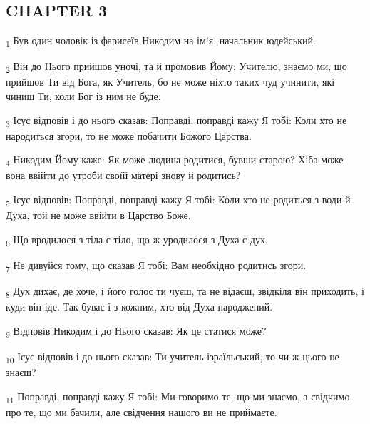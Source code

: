 \subsection{CHAPTER 3}
\begin{tcolorbox}
\textsubscript{1} Був один чоловік із фарисеїв Никодим на ім'я, начальник юдейський.
\end{tcolorbox}
\begin{tcolorbox}
\textsubscript{2} Він до Нього прийшов уночі, та й промовив Йому: Учителю, знаємо ми, що прийшов Ти від Бога, як Учитель, бо не може ніхто таких чуд учинити, які чиниш Ти, коли Бог із ним не буде.
\end{tcolorbox}
\begin{tcolorbox}
\textsubscript{3} Ісус відповів і до нього сказав: Поправді, поправді кажу Я тобі: Коли хто не народиться згори, то не може побачити Божого Царства.
\end{tcolorbox}
\begin{tcolorbox}
\textsubscript{4} Никодим Йому каже: Як може людина родитися, бувши старою? Хіба може вона ввійти до утроби своїй матері знову й родитись?
\end{tcolorbox}
\begin{tcolorbox}
\textsubscript{5} Ісус відповів: Поправді, поправді кажу Я тобі: Коли хто не родиться з води й Духа, той не може ввійти в Царство Боже.
\end{tcolorbox}
\begin{tcolorbox}
\textsubscript{6} Що вродилося з тіла є тіло, що ж уродилося з Духа є дух.
\end{tcolorbox}
\begin{tcolorbox}
\textsubscript{7} Не дивуйся тому, що сказав Я тобі: Вам необхідно родитись згори.
\end{tcolorbox}
\begin{tcolorbox}
\textsubscript{8} Дух дихає, де хоче, і його голос ти чуєш, та не відаєш, звідкіля він приходить, і куди він іде. Так буває і з кожним, хто від Духа народжений.
\end{tcolorbox}
\begin{tcolorbox}
\textsubscript{9} Відповів Никодим і до Нього сказав: Як це статися може?
\end{tcolorbox}
\begin{tcolorbox}
\textsubscript{10} Ісус відповів і до нього сказав: Ти учитель ізраїльський, то чи ж цього не знаєш?
\end{tcolorbox}
\begin{tcolorbox}
\textsubscript{11} Поправді, поправді кажу Я тобі: Ми говоримо те, що ми знаємо, а свідчимо про те, що ми бачили, але свідчення нашого ви не приймаєте.
\end{tcolorbox}

